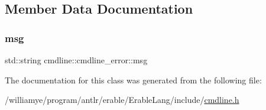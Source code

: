 \subsection{Member Data Documentation}
\mbox{\label{classcmdline_1_1cmdline__error_a46964bd9b018c935fe498a91703183fc}} 
\subsubsection{\texorpdfstring{msg}{msg}}
{\footnotesize\ttfamily std\+::string cmdline\+::cmdline\+\_\+error\+::msg\hspace{0.3cm}{\ttfamily [private]}}



The documentation for this class was generated from the following file\+:\begin{DoxyCompactItemize}
\item 
/williamye/program/antlr/erable/\+Erable\+Lang/include/\mbox{\hyperlink{cmdline_8h}{cmdline.\+h}}\end{DoxyCompactItemize}
